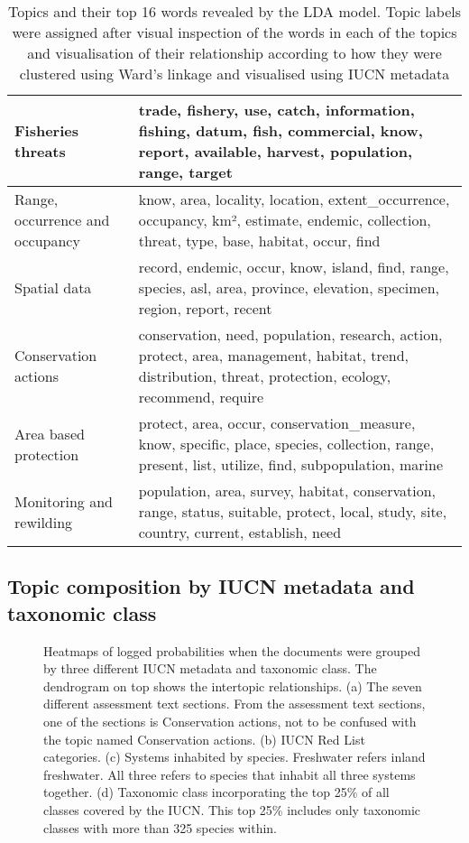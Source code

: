 \begin{table}[!hbtp]
\begin{tabulary}{1.0\textwidth}{L L}
        \hline
        Fisheries threats & trade, fishery, use, catch, information, fishing, datum, fish, commercial, know, report, available, harvest, population, range, target\\
        \hline
        Range, occurrence and occupancy & know, area, locality, location, extent\_occurrence, occupancy, km², estimate, endemic, collection, threat, type, base, habitat, occur, find\\
        \hline
        Spatial data & record, endemic, occur, know, island, find, range, species, asl, area, province, elevation, specimen, region, report, recent\\
        \hline
        Conservation actions & conservation, need, population, research, action, protect, area, management, habitat, trend, distribution, threat, protection, ecology, recommend, require\\
        \hline
        Area based protection & protect, area, occur, conservation\_measure, know, specific, place, species, collection, range, present, list, utilize, find, subpopulation, marine\\
        \hline
        Monitoring and rewilding & population, area, survey, habitat, conservation, range, status, suitable, protect, local, study, site, country, current, establish, need\\
        \hline
        \end{tabulary}
    \caption{Topics and their top 16 words revealed by the LDA model. Topic labels were assigned after visual inspection of the words in each of the topics and visualisation of their relationship according to how they were clustered using Ward's linkage and visualised using IUCN metadata }
    \label{tab:topic label and top 16 words}
\end{table}
\FloatBarrier

\subsection{Topic composition by IUCN metadata and taxonomic class}

\begin{figure}[!htbp]
\centering

\small
\caption{Heatmaps of logged probabilities when the documents were grouped by three different IUCN metadata and taxonomic class. The dendrogram on top shows the intertopic relationships. (a) The seven different assessment text sections. From the assessment text sections, one of the sections is Conservation actions, not to be confused with the topic named Conservation actions. (b) IUCN Red List categories. (c) Systems inhabited by species. Freshwater refers inland freshwater. All three refers to species that inhabit all three systems together. (d) Taxonomic class incorporating the top 25\% of all classes covered by the IUCN. This top 25\% includes only taxonomic classes with more than 325 species within.}
\label{fig:topic heatmap}
\end{figure}
\FloatBarrier

